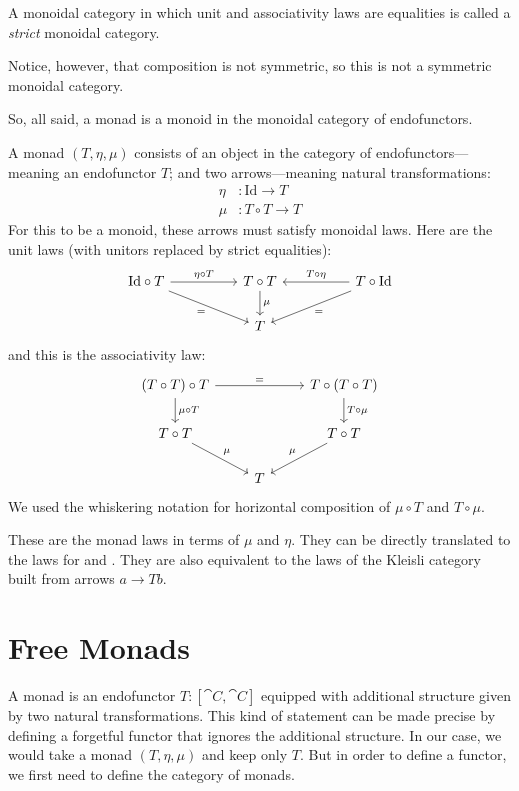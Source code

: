 \documentclass[DaoFP]{subfiles}
\begin{document}
A monoidal category in which unit and associativity laws are equalities is called a \emph{strict} monoidal category.

Notice, however, that composition is not symmetric, so this is not a symmetric monoidal category.

So, all said, a monad is a monoid in the monoidal category of endofunctors. 

A monad $(T, \eta, \mu)$ consists of an object in the category of endofunctors---meaning an endofunctor $T$; and two arrows---meaning natural transformations:
\begin{align*}
 \eta &\colon \text{Id} \to T \\
 \mu &\colon T \circ T \to T 
\end{align*}
For this to be a monoid, these arrows must satisfy monoidal laws. Here are the unit laws (with unitors replaced by strict equalities):
\[
 \begin{tikzcd}
\text{Id} \circ T
 \arrow[rr, "\eta \circ T"]
 \arrow[rrd, "="']
& & T \circ T
 \arrow[d, "\mu"]
&& T \circ \text{Id}
 \arrow[ll, "T \circ \eta"']
 \arrow[lld, "="]
 \\
 && T
  \end{tikzcd}
\]
and this is the associativity law:
\[
 \begin{tikzcd}
 (T \circ T) \circ T 
 \arrow[rr, "="]
 \arrow[d, "\mu \circ T"]
 &&
 T \circ (T \circ T)
 \arrow[d, "T \circ \mu"]
 \\
 T \circ T 
 \arrow[dr, "\mu"]
& & T \circ T
 \arrow[dl, "\mu"']
 \\
&  T
 \end{tikzcd}
\]
We used the whiskering notation for horizontal composition of $\mu \circ T$ and $T \circ \mu$.

These are the monad laws in terms of $\mu$ and $\eta$. They can be directly translated to the laws for  and . They are also equivalent to the laws of the Kleisli category built from arrows $a \to T b$.

\section{Free Monads}

A monad is an endofunctor $T \colon [\cat C, \cat C]$ equipped with additional structure given by two natural transformations. This kind of statement can be made precise by defining a forgetful functor that ignores the additional structure. In our case, we would take a monad $(T, \eta, \mu)$ and keep only $T$. But in order to define a functor, we first need to define the category of monads.
\end{document}
